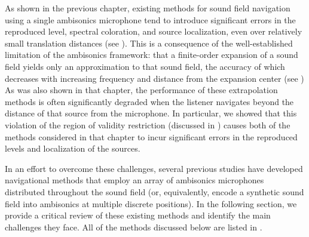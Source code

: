 As shown in the previous chapter, existing methods for sound field navigation using a single ambisonics microphone tend to introduce significant errors in the reproduced level, spectral coloration, and source localization, even over relatively small translation distances (see ).
This is a consequence of the well-established limitation of the ambisonics framework: that a finite-order expansion of a sound field yields only an approximation to that sound field, the accuracy of which decreases with increasing frequency and distance from the expansion center \citep{Poletti2005,WardAbhayapala2001} (see )
As was also shown in that chapter, the performance of these extrapolation methods is often significantly degraded when the listener navigates beyond the distance of that source from the microphone.
In particular, we showed that this violation of the region of validity restriction (discussed in ) causes both of the methods considered in that chapter to incur significant errors in the reproduced levels and localization of the sources.

In an effort to overcome these challenges, several previous studies have developed navigational methods that employ an array of ambisonics microphones distributed throughout the sound field (or, equivalently, encode a synthetic sound field into ambisonics at multiple discrete positions).
In the following section, we provide a critical review of these existing methods and identify the main challenges they face.
All of the methods discussed below are listed in .

